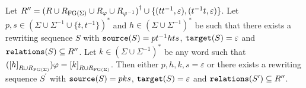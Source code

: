 \begin{lemma}\label{lem:HNN_constructive_technical_rws_lemma}
  Let $R^{\prime\prime} = {(R\cup R_{\textrm{FG}(\Sigma)}\cup R_\varphi \cup R_{\varphi^{-1}})}^\dagger
  \cup \{(tt^{-1}, \varepsilon), (t^{-1}t,\varepsilon)\}$.
  Let $p, s \in {(\Sigma\cup \Sigma^{-1}\cup \{t, t^{-1}\})}^\ast$ and
  $h\in {(\Sigma\cup\Sigma^{-1})}^\ast$ be such that there exists a rewriting sequence
  $S$ with $\texttt{source}(S) = pt^{-1}hts$, $\texttt{target}(S) = \varepsilon$ and $\texttt{relations}(S) \subseteq
  R^{\prime\prime}$. Let $k\in {(\Sigma\cup \Sigma^{-1})}^\ast$ be any word such that
  $({[h]}_{R\cup R_{\textrm{FG}(\Sigma)}})\varphi = {[k]}_{R\cup R_{\textrm{FG}(\Sigma)}}$.
  Then either $p, h, k, s = \varepsilon$ or there exists
  a rewriting sequence $S^\prime$ with $\texttt{source}(S) = pks$, $\texttt{target}(S) = \varepsilon$ and
  $\texttt{relations}(S^\prime)\subseteq R^{\prime\prime}$.
\end{lemma}
